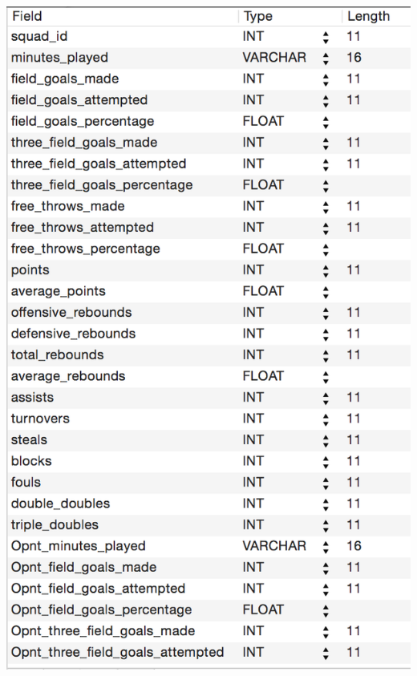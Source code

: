 \documentclass[letterpaper,10pt,english]{sphinxmanual}
\begin{document}
\includegraphics{SquadSeasonStat_table1.png}
\end{document}
